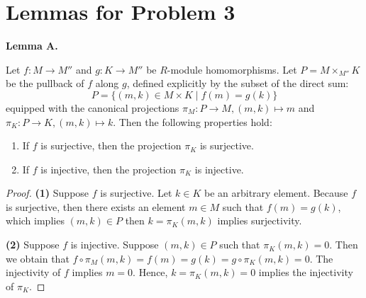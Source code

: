 \documentclass[12pt, a4paper]{article}
\theoremstyle{remark}
\newenvironment{lemma}[1]{
    \noindent \textbf{Lemma #1.} \itshape
}{
    \vspace{1em}
}
\begin{document}
\pagebreak



\section*{Lemmas for Problem 3}

\begin{lemma}{A}
Let $f: M \to M''$ and $g: K \to M''$ be $R$-module homomorphisms. Let $P = M \times_{M''} K$ be the pullback of $f$ along $g$, defined explicitly by the subset of the direct sum:
\[ P = \{ (m, k) \in M \times K \mid f(m) = g(k) \} \]
equipped with the canonical projections $\pi_M: P \to M, (m, k) \mapsto m$ and $\pi_K: P \to K, (m, k) \mapsto k$. Then the following properties hold:
\begin{enumerate}
    \item If $f$ is surjective, then the projection $\pi_K$ is surjective.
    \item If $f$ is injective, then the projection $\pi_K$ is injective.
\end{enumerate}
\end{lemma}

\begin{proof}
\textbf{(1)} Suppose $f$ is surjective. Let $k \in K$ be an arbitrary element.
Because $f$ is surjective, then there exists an element $m\in M$ such that $f(m)=g(k)$, which implies $(m,k)\in P$ then $k=\pi_{K}(m,k)$ implies surjectivity.


\textbf{(2)} Suppose $f$ is injective. Suppose $(m,k)\in P$ such that $\pi_K(m,k)=0$. 
 Then we obtain that $f\circ \pi_M(m,k) = f(m) =g(k)= g\circ \pi_K(m,k) = 0$. The injectivity of $f$ implies $m=0$. Hence, $k=\pi_{K}(m,k)=0$ implies the injectivity of $\pi_K$.
\end{proof}
\end{document}

